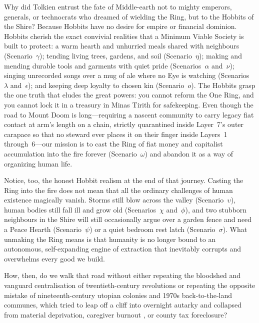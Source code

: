 Why did Tolkien entrust the fate of Middle-earth not to mighty emperors, generals, or technocrats who dreamed of wielding the Ring, but to the Hobbits of the Shire? Because Hobbits have no desire for empire or financial dominion. Hobbits cherish the exact convivial realities that a Minimum Viable Society is built to protect: a warm hearth and unhurried meals shared with neighbours (Scenario~$\gamma$); tending living trees, gardens, and soil (Scenario~$\eta$); making and mending durable tools and garments with quiet pride (Scenarios~$\alpha$ and~$\nu$); singing unrecorded songs over a mug of ale where no Eye is watching (Scenarios~$\lambda$ and~$\epsilon$); and keeping deep loyalty to chosen kin (Scenario~$o$). The Hobbits grasp the one truth that eludes the great powers: you cannot reform the One Ring, and you cannot lock it in a treasury in Minas Tirith for safekeeping. Even though the road to Mount Doom is long---requiring a nascent community to carry legacy fiat contact at arm's length on a chain, strictly quarantined inside Layer~7's outer carapace so that no steward ever places it on their finger inside Layers~1 through~6---our mission is to cast the Ring of fiat money and capitalist accumulation into the fire forever (Scenario~$\omega$) and abandon it as a way of organizing human life.

Notice, too, the honest Hobbit realism at the end of that journey. Casting the Ring into the fire does not mean that all the ordinary challenges of human existence magically vanish. Storms still blow across the valley (Scenario~$\upsilon$), human bodies still fall ill and grow old (Scenarios~$\chi$ and~$\phi$), and two stubborn neighbours in the Shire will still occasionally argue over a garden fence and need a Peace Hearth (Scenario~$\psi$) or a quiet bedroom rest latch (Scenario~$\sigma$). What unmaking the Ring means is that humanity is no longer bound to an autonomous, self-expanding engine of extraction that inevitably corrupts and overwhelms every good we build.

How, then, do we walk that road without either repeating the bloodshed and vanguard centralisation of twentieth-century revolutions or repeating the opposite mistake of nineteenth-century utopian colonies and 1970s back-to-the-land communes, which tried to leap off a cliff into overnight autarky and collapsed from material deprivation, caregiver burnout \parencite{freeman1972}, or county tax foreclosure?

